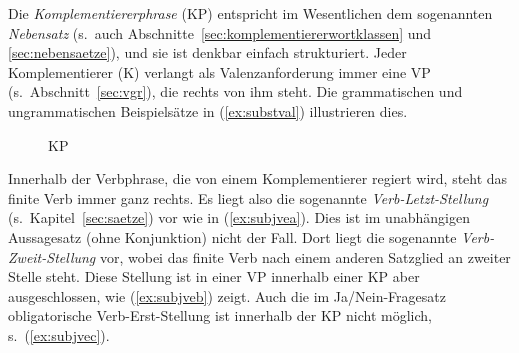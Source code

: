 
Die \textit{Komplementiererphrase} (KP) entspricht im Wesentlichen dem sogenannten \textit{Nebensatz} (s.\ auch Abschnitte~\ref{sec:komplementiererwortklassen} und \ref{sec:nebensaetze}), und sie ist denkbar einfach strukturiert.
Jeder Komplementierer (K) verlangt als Valenzanforderung immer eine VP (s.\ Abschnitt~\ref{sec:vgr}), die rechts von ihm steht.
Die grammatischen und ungrammatischen Beispielsätze in (\ref{ex:substval}) illustrieren dies.

\begin{exe}
  \ex\label{ex:substval}
  \begin{xlist}
  \end{xlist}
\end{exe}

\begin{figure}[!htbp]
  \centering
  \caption{KP}
  \label{fig:substval}
\end{figure}


Innerhalb der Verbphrase, die von einem Komplementierer regiert wird, steht das finite Verb immer ganz rechts.
Es liegt also die sogenannte \textit{Verb-Letzt-Stellung} (s.\ Kapitel~\ref{sec:saetze}) vor wie in (\ref{ex:subjvea}).
Dies ist im unabhängigen Aussagesatz (ohne Konjunktion) nicht der Fall.
Dort liegt die sogenannte \textit{Verb-Zweit-Stellung} vor, wobei das finite Verb nach einem anderen Satzglied an zweiter Stelle steht.
Diese Stellung ist in einer VP innerhalb einer KP aber ausgeschlossen, wie (\ref{ex:subjveb}) zeigt.
Auch die im Ja\slash Nein-Fragesatz obligatorische Verb-Erst-Stellung ist innerhalb der KP nicht möglich, s.\ (\ref{ex:subjvec}).

\begin{exe}
  \ex\label{ex:subjve}
  \begin{xlist}
  \end{xlist}
\end{exe}

